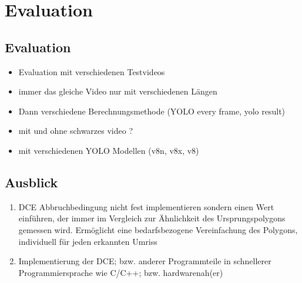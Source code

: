 \chapter{Evaluation}
\label{ch:Evaluation}

\section{Evaluation}
{
	\begin{itemize}
		\item Evaluation mit verschiedenen Testvideos
		\item immer das gleiche Video nur mit verschiedenen Längen
		\item Dann verschiedene Berechnungsmethode (YOLO every frame, yolo result)
		\item mit und ohne schwarzes video ?
		\item mit verschiedenen YOLO Modellen (v8n, v8x, v8)
	\end{itemize}

}


\section{Ausblick}
\begin{enumerate}
	\item DCE Abbruchbedingung nicht fest implementieren sondern einen Wert einführen, der immer im Vergleich zur Ähnlichkeit des Ursprungspolygons gemessen wird. Ermöglicht eine bedarfsbezogene Vereinfachung des Polygons, individuell für jeden erkannten Umriss
	\item Implementierung der DCE; bzw. anderer Programmteile in schnellerer Programmiersprache wie C/C++; bzw. hardwarenah(er)
\end{enumerate}



